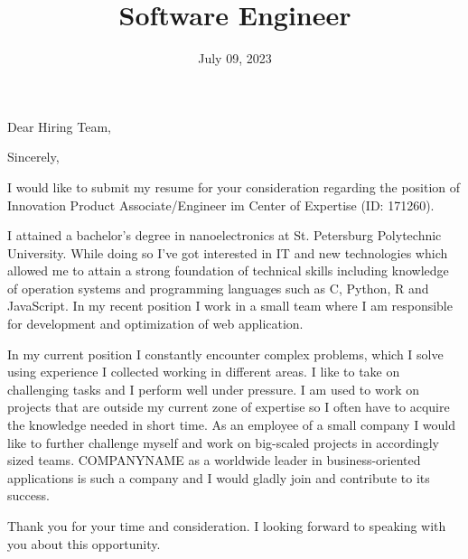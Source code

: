 \documentclass[11pt, a4paper, sans]{moderncv}
\title{Software Engineer}
\begin{document}
\date{July 09, 2023}
\opening{Dear Hiring Team,}
\closing{Sincerely,}
\makelettertitle

I would like to submit my resume for your consideration regarding the position of
Innovation Product Associate/Engineer im Center of Expertise (ID: 171260).

I attained a bachelor’s degree in nanoelectronics at St. Petersburg Polytechnic University.
While doing so I’ve got interested in IT and new technologies which allowed me to attain
a strong foundation of technical skills including knowledge of operation systems and
programming languages such as C, Python, R and JavaScript. In my recent position I work
in a small team where I am responsible for development and optimization of web
application.

In my current position I constantly encounter complex problems, which I solve using
experience I collected working in different areas. I like to take on challenging tasks and I
perform well under pressure. I am used to work on projects that are outside my current
zone of expertise so I often have to acquire the knowledge needed in short time.
As an employee of a small company I would like to further challenge myself and work on
big-scaled projects in accordingly sized teams. {COMPANYNAME} as a worldwide leader in
business-oriented applications is such a company and I would gladly join and contribute
to its success.

Thank you for your time and consideration. I looking forward to speaking with you about
this opportunity.

\makeletterclosing
\end{document}
